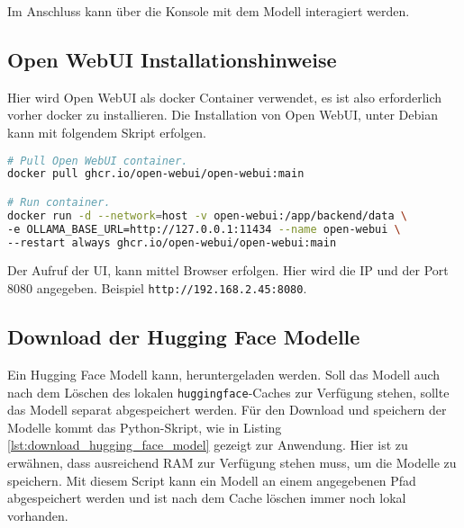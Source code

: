 Im Anschluss kann über die Konsole mit dem Modell interagiert werden.



\subsection{Open WebUI Installationshinweise}\label{sec:open_webui}
Hier wird Open WebUI als docker Container verwendet, es ist also erforderlich vorher docker zu installieren. Die Installation von Open WebUI, unter Debian kann mit folgendem Skript erfolgen. 

\begin{lstlisting}[language=bash,caption={Open WebUI installieren}]
# Pull Open WebUI container.
docker pull ghcr.io/open-webui/open-webui:main

# Run container.
docker run -d --network=host -v open-webui:/app/backend/data \
-e OLLAMA_BASE_URL=http://127.0.0.1:11434 --name open-webui \
--restart always ghcr.io/open-webui/open-webui:main
\end{lstlisting}

Der Aufruf der UI, kann mittel Browser erfolgen. Hier wird die IP und der Port 8080 angegeben. Beispiel \texttt{http://192.168.2.45:8080}.



\subsection{Download der Hugging Face Modelle}\label{sec:hugging_face_models}
Ein Hugging Face Modell kann, heruntergeladen werden. Soll das Modell auch nach dem Löschen des lokalen \texttt{huggingface}-Caches zur Verfügung stehen, sollte das Modell separat abgespeichert werden. Für den Download und speichern der Modelle kommt das Python-Skript, wie in Listing \ref{lst:download_hugging_face_model} gezeigt zur Anwendung. Hier ist zu erwähnen, dass ausreichend RAM zur Verfügung stehen muss, um die Modelle zu speichern. Mit diesem Script kann ein Modell an einem angegebenen Pfad abgespeichert werden und ist nach dem Cache löschen immer noch lokal vorhanden.




